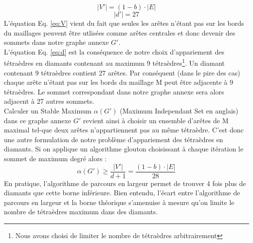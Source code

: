 \begin{equation}
\label{eq:V}
|V'|=(1-b)\cdot |E|
\end{equation}
\begin{equation}
\label{eq:d}
|d'|= 27
\end{equation}
L'équation Eq. \ref{eq:V} vient du fait que seules les arêtes n'étant pas sur les bords du maillages peuvent être utlisées comme arêtes centrales et donc devenir des sommets dans notre graphe annexe $G'$.\\
L'équation Eq. \ref{eq:d} est la conséquence de notre choix d'appariement des tétraèdres en diamants contenant au maximum 9 tétraèdres\footnote{Nous avons choisi de limiter le nombre de tétraèdres arbitrairement}. Un diamant contenant 9 tétraèdres contient 27 arêtes. Par conséquent (dans le pire des cas) chaque arête n'étant pas sur les bords du maillage M peut être adjacente à 9 tétraèdres. Le sommet correspondant dans notre graphe annexe sera alors adjacent à 27 autres sommets.\\
Calculer un Stable Maximum $\alpha(G')$ (Maximum Independant Set en anglais) dans ce graphe annexe $G'$ revient ainsi à choisir un ensemble d'arêtes de M maximal tel-que deux arêtes n'appartiennent pas au même tétraèdre. C'est donc une autre formulation de notre problème d'appariement des tétraèdres en diamants. Si on applique un algorithme glouton choisissant à chaque itération le sommet de maximum degré alors :
\begin{equation}
\alpha(G')\geqslant \frac{|V'|}{d+1} = \frac{(1-b)\cdot |E|}{28}
\end{equation}
En pratique, l'algorithme de parcours en largeur permet de trouver 4 fois plus de diamants que cette borne inférieure. Bien entendu, l'écart entre l'algorithme de parcours en largeur et la borne théorique s'amenuise à mesure qu'on limite le nombre de tétraèdres maximum dans des diamants. 

